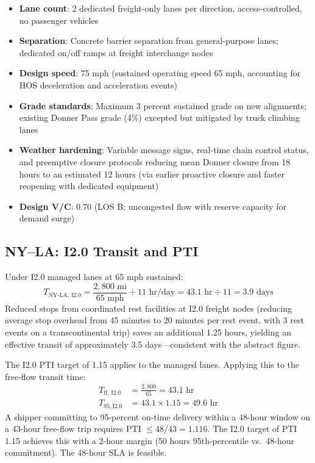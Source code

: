 \begin{itemize}
  \item \textbf{Lane count}: 2 dedicated freight-only lanes per direction, access-controlled, no passenger vehicles
  \item \textbf{Separation}: Concrete barrier separation from general-purpose lanes; dedicated on/off ramps at freight interchange nodes
  \item \textbf{Design speed}: 75 mph (sustained operating speed 65 mph, accounting for HOS deceleration and acceleration events)
  \item \textbf{Grade standards}: Maximum 3 percent sustained grade on new alignments; existing Donner Pass grade (4\%) excepted but mitigated by truck climbing lanes
  \item \textbf{Weather hardening}: Variable message signs, real-time chain control status, and preemptive closure protocols reducing mean Donner closure from 18 hours to an estimated 12 hours (via earlier proactive closure and faster reopening with dedicated equipment)
  \item \textbf{Design V/C}: 0.70 (LOS B; uncongested flow with reserve capacity for demand surge)
\end{itemize}

\subsection{NY--LA: I2.0 Transit and PTI}

Under I2.0 managed lanes at 65 mph sustained:
\begin{equation}
  T_{\text{NY-LA, I2.0}} = \frac{2{,}800 \text{ mi}}{65 \text{ mph}} \div 11 \text{ hr/day} = 43.1 \text{ hr} \div 11 = 3.9 \text{ days}
\end{equation}
Reduced stops from coordinated rest facilities at I2.0 freight nodes (reducing average stop overhead from 45 minutes to 20 minutes per rest event, with 3 rest events on a transcontinental trip) saves an additional 1.25 hours, yielding an effective transit of approximately 3.5 days---consistent with the abstract figure.

The I2.0 PTI target of 1.15 applies to the managed lanes. Applying this to the free-flow transit time:
\begin{align}
  T_{\text{ff, I2.0}} &= \frac{2{,}800}{65} = 43.1 \text{ hr} \\
  T_{95, \text{I2.0}} &= 43.1 \times 1.15 = 49.6 \text{ hr}
\end{align}
A shipper committing to 95-percent on-time delivery within a 48-hour window on a 43-hour free-flow trip requires PTI $\leq 48/43 = 1.116$. The I2.0 target of PTI 1.15 achieves this with a 2-hour margin (50 hours 95th-percentile vs.\ 48-hour commitment). The 48-hour SLA is feasible.

